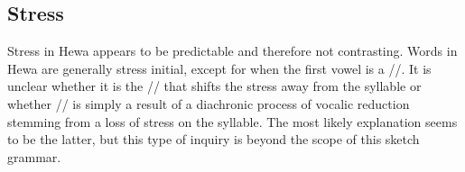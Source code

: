 \documentclass{article}
\begin{document}
\subsection{Stress}\label{sec:str}


Stress in Hewa appears to be predictable and therefore not contrasting. Words in Hewa are generally stress initial, except for when the first vowel is a /\textschwa/. It is unclear whether it is the /\textschwa/ that shifts the stress away from the syllable or whether /\textschwa/ is simply a result of a diachronic process of vocalic reduction stemming from a loss of stress on the syllable. The most likely explanation seems to be the latter, but this type of inquiry is beyond the scope of this sketch grammar.
\end{document}
